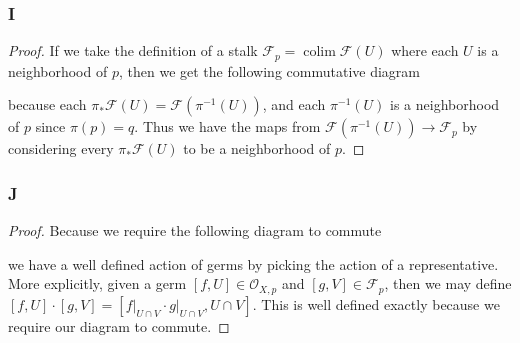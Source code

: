 \documentclass{article}
\newcommand{\fO}{\mathscr{O}}
\newcommand{\fF}{\mathscr{F}}
\DeclareMathOperator{\res}{res}
\DeclareMathOperator{\colim}{colim}
\begin{document}
\subsubsection{I}\label{2.2.I}
\begin{proof}
    If we take the definition of a stalk $\fF_p=\colim \fF(U)$ where each $U$ is a neighborhood of $p$, then we get the following commutative diagram
    \begin{center}
    \end{center}
    because each $\pi_* \fF(U)=\fF(\pi^{-1}(U))$, and each $\pi^{-1}(U)$ is a neighborhood of $p$ since $\pi(p)=q$. Thus we have the maps from $\fF(\pi^{-1}(U))\to \fF_p$ by considering every $\pi_*\fF(U)$ to be a neighborhood of $p$.
\end{proof}
\subsubsection{J}\label{2.2.J}
\begin{proof}
    Because we require the following diagram to commute
    \begin{center}
    \end{center}
    we have a well defined action of germs by picking the action of a representative. More explicitly, given a germ $[f,U]\in \fO_{X,p}$ and $[g,V] \in \fF_p$, then we may define $[f,U]\cdot [g,V]=[f\vert_{U\cap V}\cdot g\vert_{U\cap V},U\cap V]$. This is well defined exactly because we require our diagram to commute.
\end{proof}
\subsection{}
\end{document}
